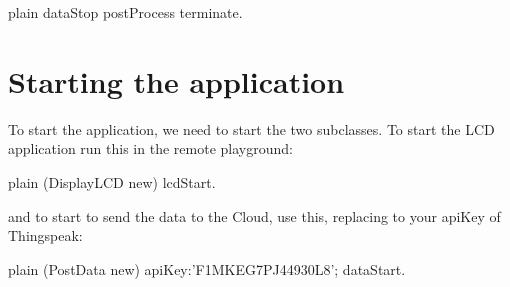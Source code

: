\documentclass[10pt,twoside,english]{_support/latex/sbabook/sbabook}
\begin{document}
\begin{displaycode}{plain}
dataStop
    postProcess terminate. 
\end{displaycode}
\section{Starting the application}
To start the application, we need to start the two subclasses. To start the LCD application run this in the remote playground:

\begin{displaycode}{plain}
(DisplayLCD new) lcdStart.
\end{displaycode}

and to start to send the data to the Cloud, use this, replacing to your apiKey of Thingspeak:

\begin{displaycode}{plain}
(PostData new) apiKey:'F1MKEG7PJ44930L8'; dataStart.
\end{displaycode}


\backmatter

\end{document}
